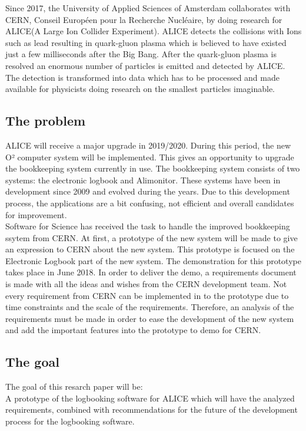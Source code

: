 \documentclass[paper=a4, fontsize=11pt,twoside]{scrartcl}	%
\begin{document}
Since 2017, the University of Applied Sciences of Amsterdam collaborates with CERN, Conseil Européen pour la Recherche Nucléaire, by doing research for ALICE(A Large Ion Collider Experiment). ALICE detects the collisions with Ions such as lead resulting in quark-gluon plasma which is believed to have existed just a few milliseconds after the Big Bang. After the quark-gluon plasma is resolved an enormous number of particles is emitted and detected by ALICE. The  detection  is  transformed  into  data  which  has  to  be  processed  and  made available for physicists doing research on the smallest particles imaginable.  
\subsection{The problem}
ALICE will receive a major upgrade in 2019/2020. During this period, the new O² computer system will be implemented. This gives an opportunity to upgrade the bookkeeping system currently in use. The bookkeeping system consists of two systems: the electronic logbook and Alimonitor. These systems have been in development since 2009 and evolved during the years. Due to this development process, the applications are a bit confusing, not efficient and overall candidates for improvement. \\
Software for Science has received the task to handle the improved bookkeeping ssytem from CERN. At first, a prototype of the new system will be made to give an expression to CERN about the new system. This prototype is focused on the Electronic Logbook part of the new system. The demonstration for this prototype takes place in June 2018. In order to deliver the demo, a requirements document is made with all the ideas and wishes from the CERN development team. Not every requirement from CERN can be implemented in to the prototype due to time constraints and the scale of the requirements. Therefore, an analysis of the requirements must be made in order to ease the development of the new system and add the important features into the prototype to demo for CERN. 

\subsection{The goal}
The goal of this resarch paper will be: \\

A prototype of the logbooking software for ALICE which will have the analyzed requirements, combined with recommendations for the future of the development process for the logbooking software. \\
\end{document}
